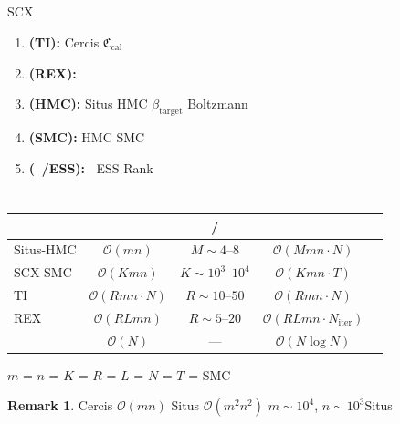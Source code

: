 \documentclass[12pt,a4paper]{article}
\theoremstyle{plain}
\theoremstyle{definition}
\newtheorem{remark}[theorem]{ Remark}
\newcommand{\Ocal}{\mathcal{O}}
\newcommand{\Cercis}{\mathfrak{C}}
\DeclareMathOperator{\Rhat}{\hat{R}}
\begin{document}
\subsection{}

 SCX 

\begin{enumerate}[label=\textbf{ \arabic*:},leftmargin=*]
    \item \textbf{ (TI):}  Cercis 
        $\Cercis_{\text{cal}}$
    \item \textbf{ (REX):} 
        
    \item \textbf{ (HMC):}  Situs  HMC 
         $\beta_{\text{target}}$  Boltzmann 
    \item \textbf{ (SMC):} 
         HMC  SMC 
    \item \textbf{ ($\Rhat$/ESS):}  $\Rhat$ESS  Rank
        
\end{enumerate}

\subsection{}

\begin{table}[H]
\centering
\caption{}
\begin{tabular}{lcccc}
\toprule
\textbf{} & \textbf{} & \textbf{/} & \textbf{} & \textbf{} \\
\midrule
Situs-HMC & $\Ocal(mn)$ & $M \sim 4$–$8$ & $\Ocal(Mmn \cdot N)$ &  \\
SCX-SMC  & $\Ocal(Kmn)$ & $K \sim 10^3$–$10^4$ & $\Ocal(Kmn \cdot T)$ &  \\
TI       & $\Ocal(Rmn \cdot N)$ & $R \sim 10$–$50$ & $\Ocal(Rmn \cdot N)$ &  \\
REX      & $\Ocal(RLmn)$ & $R \sim 5$–$20$ & $\Ocal(RLmn \cdot N_{\text{iter}})$ &  \\
     & $\Ocal(N)$ & — & $\Ocal(N \log N)$ &  \\
\bottomrule
\end{tabular}
\label{tab:complexity}
\end{table}

 $m$ = $n$ = $K$ = $R$ = 
$L$ = $N$ = $T$ = SMC 

\begin{remark}
\textbf{} Cercis $\Ocal(mn)$
Situs $\Ocal(m^2n^2)$
$m \sim 10^4$, $n \sim 10^3$Situs 
\end{remark}

\subsection{}
\end{document}
